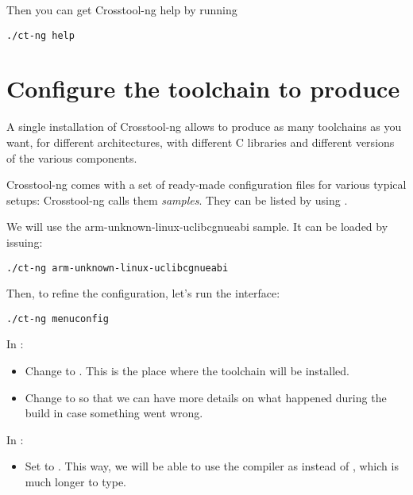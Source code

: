 Then you can get Crosstool-ng help by running

\begin{verbatim}
./ct-ng help
\end{verbatim}

\section{Configure the toolchain to produce}

A single installation of Crosstool-ng allows to produce as many
toolchains as you want, for different architectures, with different C
libraries and different versions of the various components.

Crosstool-ng comes with a set of ready-made configuration files for
various typical setups: Crosstool-ng calls them {\em samples}. They can be
listed by using .

We will use the arm-unknown-linux-uclibcgnueabi sample. It can be loaded by issuing:

\begin{verbatim}
./ct-ng arm-unknown-linux-uclibcgnueabi
\end{verbatim}

Then, to refine the configuration, let's run the  interface:

\begin{verbatim}
./ct-ng menuconfig
\end{verbatim}

In :

\begin{itemize}
\item Change  to
  . This is the place where
  the toolchain will be installed.
\item Change  to  so that we can have more
  details on what happened during the build in case something went wrong.
\end{itemize}

In :
\begin{itemize}
\item Set  to . This way, we will
  be able to use the compiler as  instead of
  , which is much longer to
  type.
\end{itemize}


